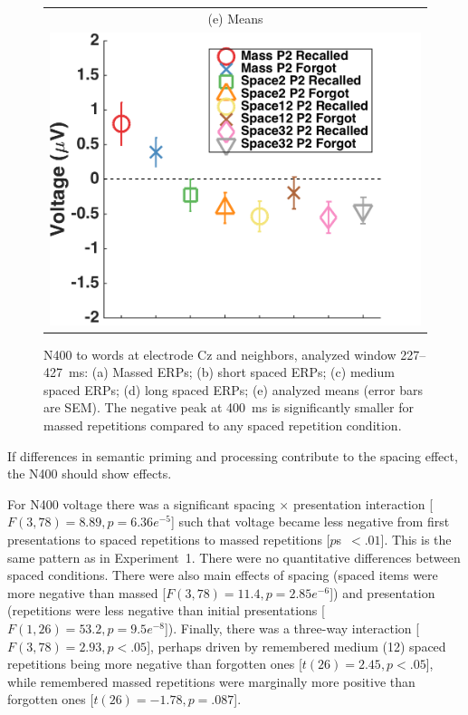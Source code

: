 \begin{figure}[hp]
\begin{tabular}{cc}
  \multicolumn{2}{c}{(e) Means} \\
  \multicolumn{2}{c}{\includegraphics[width=.35\textwidth]{./figs/exp2/tla_avg_ga_word_rc_mass_p2_word_fo_mass_p2_word_rc_spac2_p2_word_fo_spac2_p2_word_rc_spac12_p2_word_fo_spac12_p2_word_rc_spac32_p2_word_fo_spac32_p2_C_277_427_ylabel}} \\
  \end{tabular}
  \caption{N400 to words at electrode Cz and neighbors, analyzed window 227--427~ms: (a) Massed ERPs; (b) short spaced ERPs; (c) medium spaced ERPs; (d) long spaced ERPs; (e) analyzed means (error bars are SEM).  The negative peak at 400~ms is significantly smaller for massed repetitions compared to any spaced repetition condition.}
  \label{fig:s2_N400}
\end{figure}


If differences in semantic priming and processing contribute to the spacing effect, the N400 should show effects.

For N400 voltage there was a significant spacing $\times$ presentation interaction [$F(3,78)=8.89, p=6.36e^{-5}$] such that voltage became less negative from first presentations to spaced repetitions to massed repetitions [$p$s~$<.01$].  This is the same pattern as in Experiment~1.  There were no quantitative differences between spaced conditions.  There were also main effects of spacing (spaced items were more negative than massed [$F(3,78)=11.4, p=2.85e^{-6}$]) and presentation (repetitions were less negative than initial presentations [$F(1,26)=53.2, p=9.5e^{-8}$]).  Finally, there was a three-way interaction [$F(3,78)=2.93, p<.05$], perhaps driven by remembered medium (12) spaced repetitions being more negative than forgotten ones [$t(26)=2.45, p<.05$], while remembered massed repetitions were marginally more positive than forgotten ones [$t(26)=-1.78, p=.087$].



